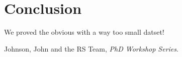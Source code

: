 \documentclass[11pt]{article}
\begin{document}
\section*{Conclusion}

We proved the obvious with a way too small datset!

\begin{thebibliography}{9}

Johnson, John and the RS Team, \emph{PhD Workshop Series}. 

\end{thebibliography}
\end{document}
